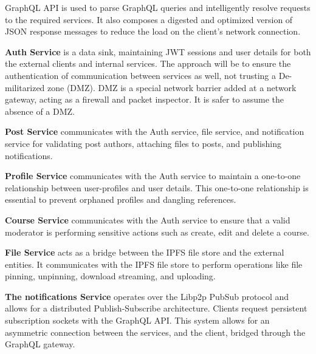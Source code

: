 GraphQL API is used to parse GraphQL queries and intelligently resolve requests to the required services. 
It also composes a digested and optimized version of JSON response messages to reduce the load on the client's network connection.

\textbf{Auth Service} is a data sink, maintaining JWT sessions and user details for both the external clients and internal services. 
The approach will be to ensure the authentication of communication between services as well, not trusting a De-militarized zone (DMZ).
DMZ is a special network barrier added at a network gateway, acting as a firewall and packet inspector. It is safer to assume the absence of a DMZ.

\textbf{Post Service} communicates with the Auth service, file service, and notification service for validating post authors, attaching files to posts, 
and publishing notifications.

\textbf{Profile Service} communicates with the Auth service to maintain a one-to-one relationship between user-profiles and user details. 
This one-to-one relationship is essential to prevent orphaned profiles and dangling references.

\textbf{Course Service} communicates with the Auth service to ensure that a valid moderator is performing sensitive actions such as create, edit and delete a course. 

\textbf{File Service} acts as a bridge between the IPFS file store and the external entities. 
It communicates with the IPFS file store to perform operations like file pinning, unpinning, download streaming, and uploading.

\textbf{The notifications Service} operates over the Libp2p PubSub protocol and allows for a distributed Publish-Subscribe architecture. 
Clients request persistent subscription sockets with the GraphQL API. This system allows for an asymmetric connection between 
the services, and the client, bridged through the GraphQL gateway.